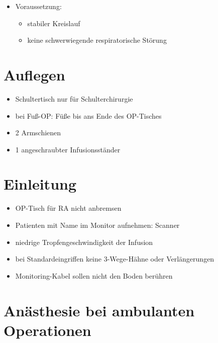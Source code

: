 \documentclass[
]{book}
\providecommand{\tightlist}{%
  \setlength{\itemsep}{0pt}\setlength{\parskip}{0pt}}
\begin{document}
\begin{itemize}
\tightlist
\item
  Voraussetzung:

  \begin{itemize}
  \tightlist
  \item
    stabiler Kreislauf
  \item
    keine schwerwiegende respiratorische Störung
  \end{itemize}
\end{itemize}

\hypertarget{auflegen}{%
\section{Auflegen}\label{auflegen}}

\begin{itemize}
\tightlist
\item
  Schultertisch nur für Schulterchirurgie
\item
  bei Fuß-OP: Füße bis ans Ende des OP-Tisches
\item
  2 Armschienen
\item
  1 angeschraubter Infusionsständer
\end{itemize}

\hypertarget{einleitung}{%
\section{Einleitung}\label{einleitung}}

\begin{itemize}
\tightlist
\item
  OP-Tisch für RA nicht anbremsen
\item
  Patienten mit Name im Monitor aufnehmen: Scanner
\item
  niedrige Tropfengeschwindigkeit der Infusion
\item
  bei Standardeingriffen keine 3-Wege-Hähne oder Verlängerungen
\item
  Monitoring-Kabel sollen nicht den Boden berühren
\end{itemize}

\hypertarget{anuxe4sthesie-bei-ambulanten-operationen}{%
\section{Anästhesie bei ambulanten Operationen}\label{anuxe4sthesie-bei-ambulanten-operationen}}
\end{document}
